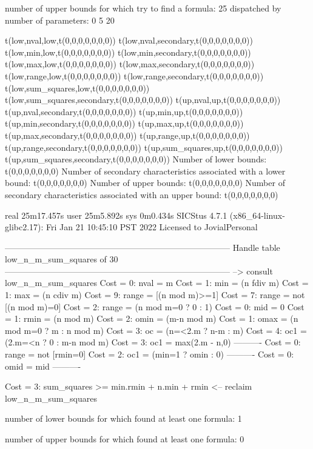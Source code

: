 number of upper bounds for which try to find a formula: 25
dispatched by number of parameters: 0  5  20

t(low,nval,low,t(0,0,0,0,0,0,0))
t(low,nval,secondary,t(0,0,0,0,0,0,0))
t(low,min,low,t(0,0,0,0,0,0,0))
t(low,min,secondary,t(0,0,0,0,0,0,0))
t(low,max,low,t(0,0,0,0,0,0,0))
t(low,max,secondary,t(0,0,0,0,0,0,0))
t(low,range,low,t(0,0,0,0,0,0,0))
t(low,range,secondary,t(0,0,0,0,0,0,0))
t(low,sum_squares,low,t(0,0,0,0,0,0,0))
t(low,sum_squares,secondary,t(0,0,0,0,0,0,0))
t(up,nval,up,t(0,0,0,0,0,0,0))
t(up,nval,secondary,t(0,0,0,0,0,0,0))
t(up,min,up,t(0,0,0,0,0,0,0))
t(up,min,secondary,t(0,0,0,0,0,0,0))
t(up,max,up,t(0,0,0,0,0,0,0))
t(up,max,secondary,t(0,0,0,0,0,0,0))
t(up,range,up,t(0,0,0,0,0,0,0))
t(up,range,secondary,t(0,0,0,0,0,0,0))
t(up,sum_squares,up,t(0,0,0,0,0,0,0))
t(up,sum_squares,secondary,t(0,0,0,0,0,0,0))
Number of lower bounds:                                             t(0,0,0,0,0,0,0)
Number of secondary characteristics associated with a lower bound:  t(0,0,0,0,0,0,0)
Number of upper bounds:                                             t(0,0,0,0,0,0,0)
Number of secondary characteristics associated with an upper bound: t(0,0,0,0,0,0,0)

real	25m17.457s
user	25m5.892s
sys	0m0.434s
SICStus 4.7.1 (x86_64-linux-glibc2.17): Fri Jan 21 10:45:10 PST 2022
Licensed to JovialPersonal


--------------------------------------------------------------------------------
Handle table low_n_m_sum_squares of 30
--------------------------------------------------------------------------------
--> consult low_n_m_sum_squares
Cost =  0:  nval  = m
Cost =  1:  min   = (n fdiv m)
Cost =  1:  max   = (n cdiv m)
Cost =  9:  range = [(n mod m)>=1]
Cost =  7:  range = not [(n mod m)=0]
Cost =  2:  range = (n mod m=0 ? 0 : 1)
Cost =  0:  mid   = 0
Cost =  1:  rmin  = (n mod m)
Cost =  2:  omin  = (m-n mod m)
Cost =  1:  omax  = (n mod m=0 ? m : n mod m)
Cost =  3:  oc    = (n=<2.m ? n-m : m)
Cost =  4:  oc1   = (2.m=<n ? 0 : m-n mod m)
Cost =  3:  oc1   = max(2.m - n,0)
----------
Cost =  0:  range = not [rmin=0]
Cost =  2:  oc1   = (min=1 ? omin : 0)
----------
Cost =  0:  omid  = mid
----------

Cost =  3:  sum_squares >= min.rmin + n.min + rmin
<-- reclaim low_n_m_sum_squares

number of lower bounds for which found at least one formula: 1

number of upper bounds for which found at least one formula: 0

